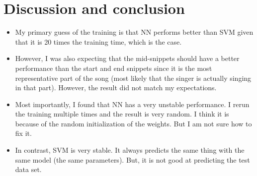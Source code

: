 \documentclass[letterpaper,12pt]{article}
\begin{document}
\section{Discussion and conclusion}
\begin{itemize}
    \item My primary guess of the training is that NN performs better than SVM given that it is 20 times the training time, which is the case.
    \item However, I was also expecting that the mid-snippets should have a better performance than the start and end snippets since it is the most representative part of the song (most likely that the singer is actually singing in that part). However, the result did not match my expectations.
    \item Most importantly, I found that NN has a very unstable performance. I rerun the training multiple times and the result is very random. I think it is because of the random initialization of the weights. But I am not sure how to fix it.
    \item In contrast, SVM is very stable. It always predicts the same thing with the same model (the same parameters). But, it is not good at predicting the test data set.
\end{itemize}
\end{document}
